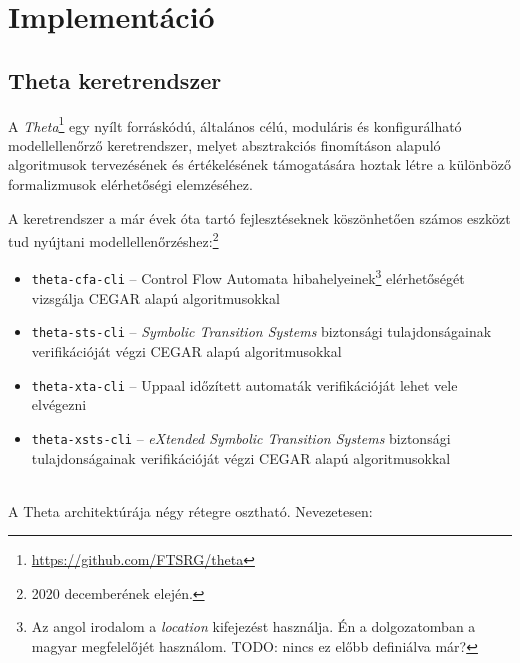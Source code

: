 \chapter{Implementáció}

\section{Theta keretrendszer}
\label{sec:theta_keretrendszer}

A \emph{Theta}\footnote{\url{https://github.com/FTSRG/theta}} egy nyílt forráskódú, általános célú, moduláris és konfigurálható modellellenőrző keretrendszer, melyet absztrakciós finomításon alapuló algoritmusok tervezésének és értékelésének támogatására hoztak létre a különböző formalizmusok elérhetőségi elemzéséhez.

A keretrendszer a már évek óta tartó fejlesztéseknek köszönhetően számos eszközt tud nyújtani modellellenőrzéshez:\footnote{2020 decemberének elején.}

\begin{itemize}
	\item \verb+theta-cfa-cli+ -- Control Flow Automata hibahelyeinek\footnote{Az angol irodalom a \emph{location} kifejezést használja. Én a dolgozatomban a magyar megfelelőjét használom. TODO: nincs ez előbb definiálva már?} elérhetőségét vizsgálja CEGAR alapú algoritmusokkal
	
	\item \verb+theta-sts-cli+ -- \emph{Symbolic Transition Systems} biztonsági tulajdonságainak verifikációját végzi CEGAR alapú algoritmusokkal
	
	\item \verb+theta-xta-cli+ -- Uppaal időzített automaták verifikációját lehet vele elvégezni
	
	\item \verb+theta-xsts-cli+ -- \emph{eXtended Symbolic Transition Systems} biztonsági tulajdonságainak verifikációját végzi CEGAR alapú algoritmusokkal
\end{itemize}
\ \\
A Theta architektúrája négy rétegre osztható. Nevezetesen:

